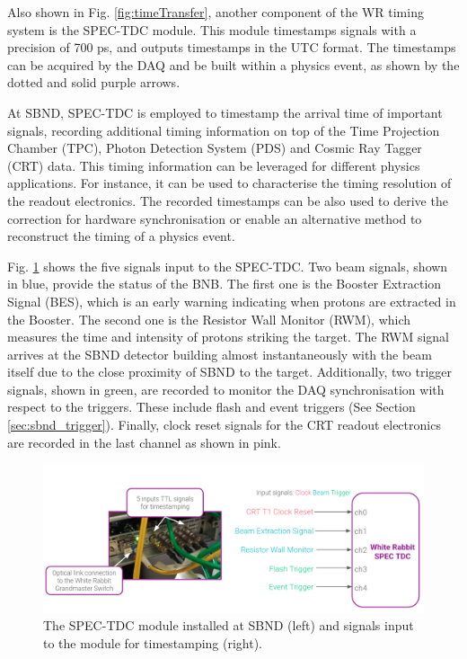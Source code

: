 Also shown in Fig. \ref{fig:timeTransfer}, another component of the WR timing system is the SPEC-TDC module.
This module timestamps signals with a precision of 700 ps, and outputs timestamps in the UTC format.
The timestamps can be acquired by the DAQ and be built within a physics event, as shown by the dotted and solid purple arrows. 

At SBND, SPEC-TDC is employed to timestamp the arrival time of important signals, recording additional timing information on top of the Time Projection Chamber (TPC), Photon Detection System (PDS) and Cosmic Ray Tagger (CRT) data.
This timing information can be leveraged for different physics applications.
For instance, it can be used to characterise the timing resolution of the readout electronics.
The recorded timestamps can be also used to derive the correction for hardware synchronisation or enable an alternative method to reconstruct the timing of a physics event. 

Fig. \ref{fig:SPECTDC} shows the five signals input to the SPEC-TDC. 
Two beam signals, shown in blue, provide the status of the BNB.
The first one is the Booster Extraction Signal (BES), which is an early warning indicating when protons are extracted in the Booster.
The second one is the Resistor Wall Monitor (RWM), which measures the time and intensity of protons striking the target.
The RWM signal arrives at the SBND detector building almost instantaneously with the beam itself due to the close proximity of SBND to the target.
Additionally, two trigger signals, shown in green, are recorded to monitor the DAQ synchronisation with respect to the triggers. 
These include flash and event triggers (See Section \ref{sec:sbnd_trigger}).
Finally, clock reset signals for the CRT readout electronics are recorded in the last channel as shown in pink. 

\begin{figure}[hb!] 
\centering    
\includegraphics[width=1.0\textwidth]{SPEC_TDC}
\caption[SPEC-TDC Module and Its Input Signals]{
The SPEC-TDC module installed at SBND (left) and signals input to the module for timestamping (right).
}
\label{fig:SPECTDC}
\end{figure}

